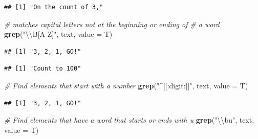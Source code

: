 \documentclass[
]{book}
\newenvironment{Shaded}{\begin{snugshade}}{\end{snugshade}}
\newcommand{\CharTok}[1]{\textcolor[rgb]{0.31,0.60,0.02}{#1}}
\newcommand{\CommentTok}[1]{\textcolor[rgb]{0.56,0.35,0.01}{\textit{#1}}}
\newcommand{\DataTypeTok}[1]{\textcolor[rgb]{0.13,0.29,0.53}{#1}}
\newcommand{\KeywordTok}[1]{\textcolor[rgb]{0.13,0.29,0.53}{\textbf{#1}}}
\newcommand{\NormalTok}[1]{#1}
\newcommand{\StringTok}[1]{\textcolor[rgb]{0.31,0.60,0.02}{#1}}
\begin{document}
\begin{verbatim}
## [1] "On the count of 3,"
\end{verbatim}

\begin{Shaded}
\begin{Highlighting}[]
\CommentTok{# matches capital letters not at the beginning or ending of}
\CommentTok{# a word}
\KeywordTok{grep}\NormalTok{(}\StringTok{"}\CharTok{\textbackslash{}\textbackslash{}}\StringTok{B[A-Z]"}\NormalTok{, text, }\DataTypeTok{value =}\NormalTok{ T)}
\end{Highlighting}
\end{Shaded}

\begin{verbatim}
## [1] "3, 2, 1, GO!"
\end{verbatim}

\begin{Shaded}
\end{Shaded}

\begin{verbatim}
## [1] "Count to 100"
\end{verbatim}

\begin{Shaded}
\begin{Highlighting}[]
\CommentTok{# Find elements that start with a number}
\KeywordTok{grep}\NormalTok{(}\StringTok{"^[[:digit:]]"}\NormalTok{, text, }\DataTypeTok{value =}\NormalTok{ T)}
\end{Highlighting}
\end{Shaded}

\begin{verbatim}
## [1] "3, 2, 1, GO!"
\end{verbatim}

\begin{Shaded}
\begin{Highlighting}[]
\CommentTok{# Find elements that have a word that starts or ends with u}
\KeywordTok{grep}\NormalTok{(}\StringTok{"}\CharTok{\textbackslash{}\textbackslash{}}\StringTok{bu"}\NormalTok{, text, }\DataTypeTok{value =}\NormalTok{ T)}
\end{Highlighting}
\end{Shaded}
\end{document}
